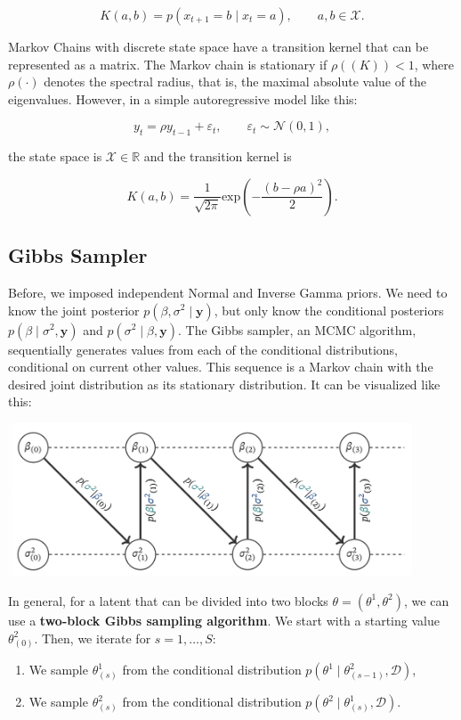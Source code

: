 \[
	K(a,b) = p(x_{t+1}=b \mid x_t = a),\qquad a,b\in \mathcal{X}.
\]

Markov Chains with discrete state space have a transition kernel that can be represented as a matrix. The Markov chain is stationary if $\rho((K))<1$, where $\rho(\cdot)$ denotes the spectral radius, that is, the maximal absolute value of the eigenvalues. However, in a simple autoregressive model like this:

\[
	y_t = \rho y_{t-1} + \varepsilon_t, \qquad \varepsilon_t\sim\mathcal{N}(0,1),
\]

the state space is $\mathcal{X} \in \mathbb{R}$ and the transition kernel is

\[
	K(a,b) = \frac{1}{\sqrt{2\pi}}\mathrm{exp}\left(-\frac{(b-\rho a)^2}{2}\right).
\]

\subsection{Gibbs Sampler}

Before, we imposed independent Normal and Inverse Gamma priors. We need to know the joint posterior $p(\beta, \sigma^2\mid\bm{y})$, but only know the conditional posteriors $p(\beta\mid\sigma^2,\bm{y})$ and $p(\sigma^2\mid\beta, \bm{y})$. The Gibbs sampler, an MCMC algorithm, sequentially generates values from each of the conditional distributions, conditional on current other values. This sequence is a Markov chain with the desired joint distribution as its stationary distribution. It can be visualized like this:

\begin{center}
	\includegraphics[width = 12cm]{gibbs.png}
\end{center}

In general, for a latent that can be divided into two blocks $\theta = (\theta^1,\theta^2)$, we can use a \textbf{two-block Gibbs sampling algorithm}. We start with a starting value $\theta^2_{(0)}$. Then, we iterate for $s = 1, \dots, S$:

\begin{enumerate}
	\item We sample $\theta^1_{(s)}$ from the conditional distribution $p(\theta^1\mid\theta^2_{(s-1)},\mathcal{D})$,
	\item We sample $\theta^2_{(s)}$ from the conditional distribution $p(\theta^2\mid\theta^1_{(s)},\mathcal{D})$.
\end{enumerate}

